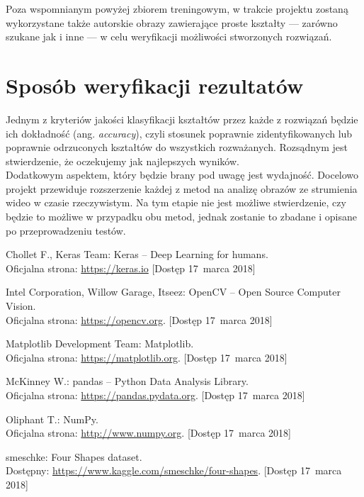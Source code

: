\documentclass[11pt,a4paper]{article}
\begin{document}
Poza wspomnianym powyżej zbiorem treningowym, w trakcie projektu zostaną wykorzystane także autorskie obrazy zawierające proste kształty --- zarówno szukane jak i inne --- w celu weryfikacji możliwości stworzonych rozwiązań.

\section{Sposób weryfikacji rezultatów} %

Jednym z kryteriów jakości klasyfikacji kształtów przez każde z rozwiązań będzie ich dokładność (ang. \emph{accuracy}), czyli stosunek poprawnie zidentyfikowanych lub poprawnie odrzuconych kształtów do wszystkich rozważanych. Rozsądnym jest stwierdzenie, że oczekujemy jak najlepszych wyników.\\

Dodatkowym aspektem, który będzie brany pod uwagę jest wydajność. Docelowo projekt przewiduje rozszerzenie każdej z metod na analizę obrazów ze strumienia wideo w czasie rzeczywistym. Na tym etapie nie jest możliwe stwierdzenie, czy będzie to możliwe w przypadku obu metod, jednak zostanie to zbadane i opisane po przeprowadzeniu testów.

\begin{thebibliography}{9} %

        Chollet F., Keras Team:
        Keras -- Deep Learning for humans. \\
        Oficjalna strona: \url{https://keras.io}
        [Dostęp 17~marca 2018]

        Intel Corporation, Willow Garage, Itseez:
        OpenCV -- Open Source Computer Vision. \\
        Oficjalna strona: \url{https://opencv.org}.
        [Dostęp 17~marca 2018]

        Matplotlib Development Team:
        Matplotlib. \\
        Oficjalna strona: \url{https://matplotlib.org}.
        [Dostęp 17~marca 2018]

        McKinney W.:
        pandas -- Python Data Analysis Library. \\
        Oficjalna strona: \url{https://pandas.pydata.org}.
        [Dostęp 17~marca 2018]

        Oliphant T.:
        NumPy. \\
        Oficjalna strona: \url{http://www.numpy.org}.
        [Dostęp 17~marca 2018]

        smeschke:
        Four Shapes dataset. \\
        Dostępny: \url{https://www.kaggle.com/smeschke/four-shapes}.
        [Dostęp 17~marca 2018]

\end{thebibliography}
\end{document}
